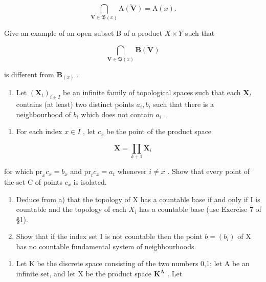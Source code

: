 \[
\bigcap_ {\mathbf {V} \in \mathfrak {B} (x)} \overline {{\mathrm{A} (\mathbf {V})}} = \mathrm{A} (x).
\]

Give an example of an open subset B of a product \(X \times Y\) such that

\[
\bigcap_ {\mathbf {V} \in \mathfrak {B} (x)} \overline {{\mathbf {B} (\mathbf {V})}}
\]

is different from \(\mathbf{B}_{(x)}\) .

\begin{enumerate}
\def\labelenumi{\arabic{enumi})}
\setcounter{enumi}{2}
\tightlist
\item
  Let \((\mathbf{X}_t)_{i\in I}\) be an infinite family of topological spaces such that each \(\mathbf{X}_t\) contains (at least) two distinct points \(a_i, b_i\) such that there is a neighbourhood of \(b_i\) which does not contain \(a_i\) .
\end{enumerate}

\begin{enumerate}
\def\labelenumi{\alph{enumi})}
\tightlist
\item
  For each index \(x \in I\) , let \(c_{x}\) be the point of the product space
\end{enumerate}

\[
\mathbf {X} = \prod_ {k + 1} \mathbf {X} _ {i}
\]

for which \(\mathrm{pr}_x c_x = b_x\) and \(\mathrm{pr}_t c_x = a_t\) whenever \(i \neq x\) . Show that every point of the set C of points \(c_x\) is isolated.

\begin{enumerate}
\def\labelenumi{\alph{enumi})}
\setcounter{enumi}{1}
\item
  Deduce from a) that the topology of X has a countable base if and only if I is countable and the topology of each \(X_{i}\) has a countable base (use Exercise 7 of §1).
\item
  Show that if the index set I is not countable then the point \(b = (b_{i})\) of X has no countable fundamental system of neighbourhoods.
\end{enumerate}

\begin{enumerate}
\def\labelenumi{\arabic{enumi})}
\setcounter{enumi}{3}
\tightlist
\item
  Let K be the discrete space consisting of the two numbers 0,1; let A be an infinite set, and let X be the product space \(\mathbf{K}^{\mathbf{A}}\) . Let
\end{enumerate}

